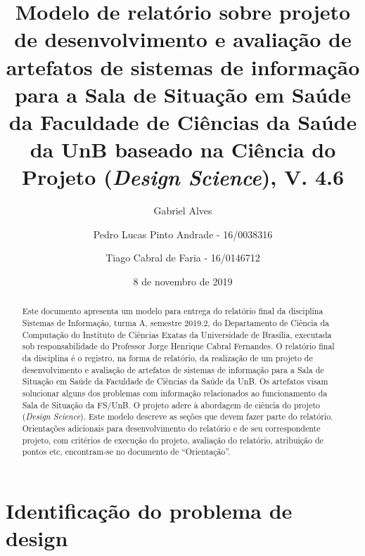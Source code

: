 \documentclass[12pt]{article}
\newcommand{\rascbegin}{\color{red}}    %
\newcommand{\rascend}{\color{black}}    %
\begin{document}
	
	\title{Modelo de relatório sobre projeto de desenvolvimento e avaliação de artefatos de sistemas de informação para a Sala de Situação em Saúde da Faculdade de Ciências da Saúde da UnB baseado na Ciência do Projeto (\textit{Design Science}), V. 4.6}
	
	
	
	\author{Gabriel Alves \and Pedro Lucas Pinto Andrade - 16/0038316 \and Tiago Cabral de Faria - 16/0146712}
	
	\date{8 de novembro de 2019}
	
	\maketitle
	\tableofcontents
	\listoffigures
	\listoftables
	\printnoidxglossary
	
	
	
	
	\begin{abstract}
		\rascbegin
		Este documento apresenta um modelo para entrega do relatório final da disciplina Sistemas de Informação, turma A, semestre 2019.2, do Departamento de Ciência da Computação do Instituto de Ciências Exatas da Universidade de Brasília, executada sob responsabilidade do Professor Jorge Henrique Cabral Fernandes. 
		O relatório final da disciplina é o registro, na forma de relatório, da realização de um projeto de desenvolvimento e avaliação de artefatos de sistemas de informação para a Sala de Situação em Saúde da Faculdade de Ciências da Saúde da UnB. 
		Os artefatos visam solucionar alguns dos problemas com informação relacionados ao funcionamento da Sala de Situação da FS/UnB.
		O projeto adere à abordagem de ciência do projeto (\textit{Design Science}). 
		Este modelo descreve as seções que devem fazer parte do relatório.
		Orientações adicionais para desenvolvimento do relatório e de seu correspondente projeto, com critérios de execução do projeto, avaliação do relatório, atribuição de pontos etc, encontram-se no docu\-mento de ``Orientação''.
		\rascend
	\end{abstract}	
	
	
	\section{Identificação do problema de design\label{Sec:CP:IdentifProblema}}
	
\end{document}
